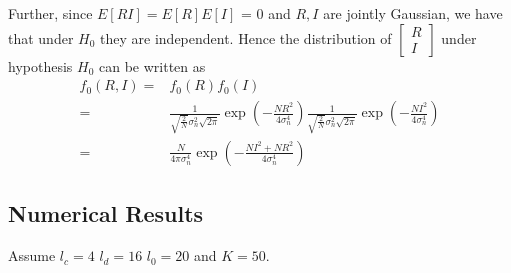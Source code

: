Further, since $E[RI] = E[R]E[I]$ = 0 and $R, I$ are jointly Gaussian, we have that under $H_0$ they are independent. Hence the distribution of $\begin{bmatrix}
  R \\
  I
\end{bmatrix}$ under hypothesis $H_0$ can be written as
\begin{equation}
  \begin{split}
	f_0(R, I)= &f_0(R)f_0(I)\\
	= &\frac{1}{\sqrt{\frac{2}{N}}\sigma_n^2\sqrt{2\pi}}\exp\left( -\frac{NR^2}{4\sigma_n^4} \right)\frac{1}{\sqrt{\frac{2}{N}}\sigma_n^2\sqrt{2\pi}}\exp\left( -\frac{NI^2}{4\sigma_n^4} \right)\\
	=&\frac{N}{4\pi \sigma_n^4}\exp\left( -\frac{NI^2+NR^2}{4\sigma_n^4} \right) 
  \end{split}
  \label{f0R0}
\end{equation}
\subsection{Numerical Results}

Assume $l_c = 4$ $l_d = 16$ $l_0 = 20$ and $K = 50$. 

